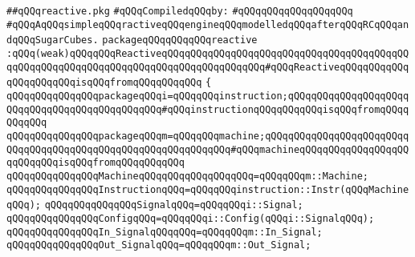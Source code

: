 \label{src/lib/reactive/reactive.pkg}
\verb|##qQQqreactive.pkg|\newline
\newline
\verb|#qQQqCompiledqQQqby:|\newline
\verb|#qQQqqQQqqQQqqQQqqQQq|\newline
\newline
\verb|#qQQqAqQQqsimpleqQQqractiveqQQqengineqQQqmodelledqQQqafterqQQqRCqQQqandqQQqSugarCubes.|\newline
\newline
\newline
\verb|packageqQQqqQQqqQQqreactive|\newline
\verb|:qQQq(weak)qQQqqQQqReactiveqQQqqQQqqQQqqQQqqQQqqQQqqQQqqQQqqQQqqQQqqQQqqQQqqQQqqQQqqQQqqQQqqQQqqQQqqQQqqQQqqQQqqQQq#qQQqReactiveqQQqqQQqqQQqqQQqqQQqqQQqisqQQqfromqQQqqQQqqQQq|\newline
\verb|{|\newline
\verb|qQQqqQQqqQQqqQQqpackageqQQqi=qQQqqQQqinstruction;qQQqqQQqqQQqqQQqqQQqqQQqqQQqqQQqqQQqqQQqqQQqqQQq#qQQqinstructionqQQqqQQqqQQqisqQQqfromqQQqqQQqqQQq|\newline
\verb|qQQqqQQqqQQqqQQqpackageqQQqm=qQQqqQQqmachine;qQQqqQQqqQQqqQQqqQQqqQQqqQQqqQQqqQQqqQQqqQQqqQQqqQQqqQQqqQQqqQQq#qQQqmachineqQQqqQQqqQQqqQQqqQQqqQQqqQQqisqQQqfromqQQqqQQqqQQq|\newline
\newline
\verb|qQQqqQQqqQQqqQQqMachineqQQqqQQqqQQqqQQqqQQq=qQQqqQQqm::Machine;|\newline
\verb|qQQqqQQqqQQqqQQqInstructionqQQq=qQQqqQQqinstruction::Instr(qQQqMachineqQQq);|\newline
\newline
\verb|qQQqqQQqqQQqqQQqSignalqQQq=qQQqqQQqi::Signal;|\newline
\verb|qQQqqQQqqQQqqQQqConfigqQQq=qQQqqQQqi::Config(qQQqi::SignalqQQq);|\newline
\newline
\verb|qQQqqQQqqQQqqQQqIn_SignalqQQqqQQq=qQQqqQQqm::In_Signal;|\newline
\verb|qQQqqQQqqQQqqQQqOut_SignalqQQq=qQQqqQQqm::Out_Signal;|\newline
\newline
